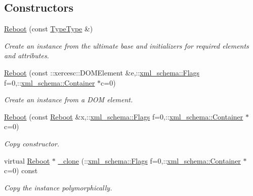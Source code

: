 \subsection*{Constructors}
\begin{DoxyCompactItemize}
\item 
\hypertarget{classopenstack_1_1xml_1_1Reboot_a7c429b209c756c69b4ad8ceacecfe0b1}{
\hyperlink{classopenstack_1_1xml_1_1Reboot_a7c429b209c756c69b4ad8ceacecfe0b1}{Reboot} (const \hyperlink{classopenstack_1_1xml_1_1RebootType}{TypeType} \&)}
\label{classopenstack_1_1xml_1_1Reboot_a7c429b209c756c69b4ad8ceacecfe0b1}

\begin{DoxyCompactList}\small\item\em Create an instance from the ultimate base and initializers for required elements and attributes. \item\end{DoxyCompactList}\item 
\hyperlink{classopenstack_1_1xml_1_1Reboot_ab49794ead3d9e8396a89e18900454dc0}{Reboot} (const ::xercesc::DOMElement \&e,::\hyperlink{namespacexml__schema_affb4c227cbd9aa7453dd1dc5a1401943}{xml\_\-schema::Flags} f=0,::\hyperlink{namespacexml__schema_a333dea2213742aea47a37532dec4ec27}{xml\_\-schema::Container} $\ast$c=0)
\begin{DoxyCompactList}\small\item\em Create an instance from a DOM element. \item\end{DoxyCompactList}\item 
\hyperlink{classopenstack_1_1xml_1_1Reboot_ad54d480fd90adb73b2403d0e68d4bfda}{Reboot} (const \hyperlink{classopenstack_1_1xml_1_1Reboot}{Reboot} \&x,::\hyperlink{namespacexml__schema_affb4c227cbd9aa7453dd1dc5a1401943}{xml\_\-schema::Flags} f=0,::\hyperlink{namespacexml__schema_a333dea2213742aea47a37532dec4ec27}{xml\_\-schema::Container} $\ast$c=0)
\begin{DoxyCompactList}\small\item\em Copy constructor. \item\end{DoxyCompactList}\item 
virtual \hyperlink{classopenstack_1_1xml_1_1Reboot}{Reboot} $\ast$ \hyperlink{classopenstack_1_1xml_1_1Reboot_a9b6bdac6941dd8ea6408c648a18266c6}{\_\-clone} (::\hyperlink{namespacexml__schema_affb4c227cbd9aa7453dd1dc5a1401943}{xml\_\-schema::Flags} f=0,::\hyperlink{namespacexml__schema_a333dea2213742aea47a37532dec4ec27}{xml\_\-schema::Container} $\ast$c=0) const 
\begin{DoxyCompactList}\small\item\em Copy the instance polymorphically. \item\end{DoxyCompactList}\end{DoxyCompactItemize}


